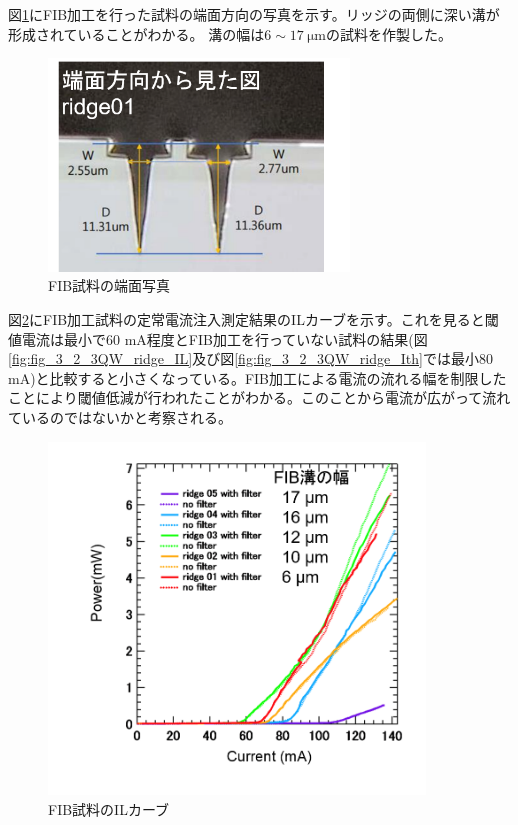 図\ref{fig:fig_5_2_FIB_facet}にFIB加工を行った試料の端面方向の写真を示す。リッジの両側に深い溝が形成されていることがわかる。
溝の幅は$6\sim17\ \si{\micro\metre}$の試料を作製した。
\begin{figure}[h]
	\centering
	\includegraphics[width=8cm]{figure/fig_5_2_FIB_facet.png}
	\caption{FIB試料の端面写真}
	\label{fig:fig_5_2_FIB_facet}
\end{figure}


図\ref{fig:fig_5_2_FIB_IL}にFIB加工試料の定常電流注入測定結果のILカーブを示す。これを見ると閾値電流は最小で60 mA程度とFIB加工を行っていない試料の結果(図\ref{fig:fig_3_2_3QW_ridge_IL}及び図\ref{fig:fig_3_2_3QW_ridge_Ith}では最小80 mA)と比較すると小さくなっている。FIB加工による電流の流れる幅を制限したことにより閾値低減が行われたことがわかる。このことから電流が広がって流れているのではないかと考察される。
\begin{figure}[h]
	\centering
	\includegraphics[width=10cm]{figure/fig_5_2_FIB_IL.png}
	\caption{FIB試料のILカーブ}
	\label{fig:fig_5_2_FIB_IL}
\end{figure}



